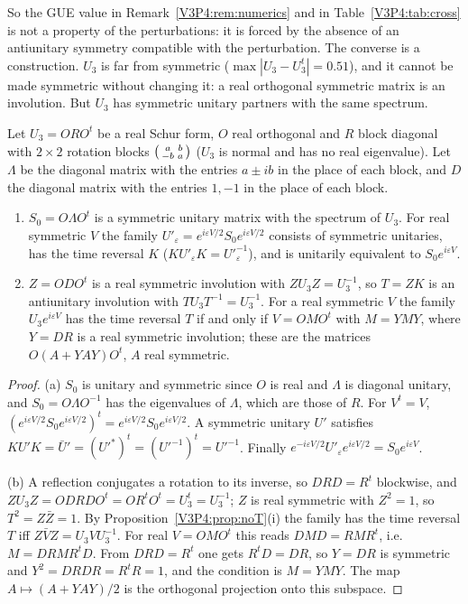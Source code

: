 So the GUE value in Remark~\ref{V3P4:rem:numerics} and in Table~\ref{V3P4:tab:cross} is not a
property of the perturbations: it is forced by the absence of an antiunitary symmetry compatible
with the perturbation. The converse is a construction. $U_3$ is far from symmetric
($\max|U_3-U_3^{t}|=0.51$), and it cannot be made symmetric without changing it: a real orthogonal
symmetric matrix is an involution. But $U_3$ has symmetric unitary partners with the same
spectrum.

\begin{proposition}\label{V3P4:prop:symfam}
Let $U_3=ORO^{t}$ be a real Schur form, $O$ real orthogonal and $R$ block diagonal with $2\times2$
rotation blocks $\begin{psmallmatrix}a&b\\-b&a\end{psmallmatrix}$ ($U_3$ is normal and has no
real eigenvalue). Let $\Lambda$ be the diagonal matrix with the entries $a\pm ib$ in the place of
each block, and $D$ the diagonal matrix with the entries $1,-1$ in the place of each block.
\begin{enumerate}
\item[(a)] $S_0=O\Lambda O^{t}$ is a symmetric unitary matrix with the spectrum of $U_3$. For
real symmetric $V$ the family $U'_\varepsilon=e^{i\varepsilon V/2}S_0e^{i\varepsilon V/2}$ consists
of symmetric unitaries, has the time reversal $K$ ($KU'_\varepsilon K=U'^{-1}_\varepsilon$), and is
unitarily equivalent to $S_0e^{i\varepsilon V}$.
\item[(b)] $Z=ODO^{t}$ is a real symmetric involution with $ZU_3Z=U_3^{-1}$, so $T=ZK$ is an
antiunitary involution with $TU_3T^{-1}=U_3^{-1}$. For a real symmetric $V$ the family
$U_3e^{i\varepsilon V}$ has the time reversal $T$ if and only if $V=OMO^{t}$ with $M=YMY$, where
$Y=DR$ is a real symmetric involution; these are the matrices $O(A+YAY)O^{t}$, $A$ real symmetric.
\end{enumerate}
\end{proposition}

\begin{proof}
(a) $S_0$ is unitary and symmetric since $O$ is real and $\Lambda$ is diagonal unitary, and
$S_0=O\Lambda O^{-1}$ has the eigenvalues of $\Lambda$, which are those of $R$. For $V^{t}=V$,
$(e^{i\varepsilon V/2}S_0e^{i\varepsilon V/2})^{t}=e^{i\varepsilon V/2}S_0e^{i\varepsilon V/2}$. A
symmetric unitary $U'$ satisfies $KU'K=\bar U'=(U'^{*})^{t}=(U'^{-1})^{t}=U'^{-1}$. Finally
$e^{-i\varepsilon V/2}U'_\varepsilon e^{i\varepsilon V/2}=S_0e^{i\varepsilon V}$.

(b) A reflection conjugates a rotation to its inverse, so $DRD=R^{t}$ blockwise, and
$ZU_3Z=ODRDO^{t}=OR^{t}O^{t}=U_3^{t}=U_3^{-1}$; $Z$ is real symmetric with $Z^{2}=1$, so
$T^{2}=Z\bar Z=1$. By Proposition~\ref{V3P4:prop:noT}(i) the family has the time reversal $T$ iff
$Z\bar VZ=U_3VU_3^{-1}$. For real $V=OMO^{t}$ this reads $DMD=RMR^{t}$, i.e.\ $M=DRMR^{t}D$. From
$DRD=R^{t}$ one gets $R^{t}D=DR$, so $Y=DR$ is symmetric and $Y^{2}=DRDR=R^{t}R=1$, and the
condition is $M=YMY$. The map $A\mapsto(A+YAY)/2$ is the orthogonal projection onto this
subspace.
\end{proof}

